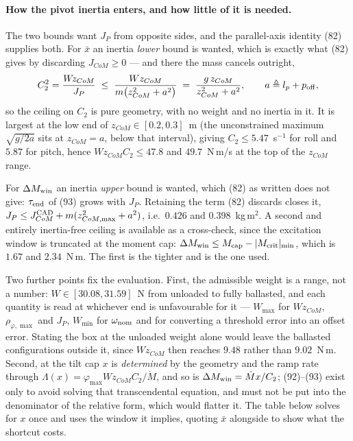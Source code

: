 \documentclass[10pt]{article}
\newcommand{\Wz}{W\!z_{CoM}}
\begin{document}
\paragraph{How the pivot inertia enters, and how little of it is needed.}
The two bounds want $J_P$ from opposite sides, and the parallel-axis
identity (82) supplies both. For $\bar x$ an inertia \emph{lower} bound
is wanted, which is exactly what (82) gives by discarding
$J_{CoM}\ge0$ --- and there the mass cancels outright,
\[
  C_2^{2} = \frac{\Wz}{J_P}
  \;\le\; \frac{W z_{CoM}}{m\bigl(z_{CoM}^2 + a^2\bigr)}
  \;=\; \frac{g\,z_{CoM}}{z_{CoM}^2 + a^2},
  \qquad a \triangleq l_p + p_{\rm off},
\]
so the ceiling on $C_2$ is pure geometry, with no weight and no
inertia in it. It is largest at the low end of $z_{CoM}\in[0.2,0.3]$~m
(the unconstrained maximum $\sqrt{g/2a}$ sits at $z_{CoM} = a$, below
that interval), giving $C_2\le5.47$~s$^{-1}$ for roll and $5.87$ for
pitch, hence $\Wz C_2 \le 47.8$ and $49.7$~N\,m/s at the top of the
$z_{CoM}$ range.

For $\Delta M_{\rm win}$ an inertia \emph{upper} bound is wanted, which
(82) as written does not give: $\tau_{\rm end}$ of (93) grows with
$J_P$. Retaining the term (82) discards closes it,
$J_P \le J_{CoM}^{\rm CAD} + m(z_{CoM,\max}^2 + a^2)$, i.e.\ $0.426$ and
$0.398$~kg\,m$^2$. A second and entirely inertia-free ceiling is
available as a cross-check, since the excitation window is truncated at
the moment cap: $\Delta M_{\rm win}\le M_{\rm cap} - |M_{\rm crit}|_{\min}$,
which is $1.67$ and $2.34$~N\,m. The first is the tighter and is the
one used.

Two further points fix the evaluation. First, the admissible weight is
a range, not a number: $W\in[30.08, 31.59]$~N from unloaded to fully
ballasted, and each quantity is read at whichever end is unfavourable
for it --- $W_{\max}$ for $\Wz$, $\rho_{\varphi,\max}$ and $J_P$,
$W_{\min}$ for $\omega_{\rm nom}$ and for converting a threshold error
into an offset error. Stating the box at the unloaded weight alone
would leave the ballasted configurations outside it, since
$\Wz$ then reaches $9.48$ rather than $9.02$~N\,m. Second, at the tilt
cap $x$ is \emph{determined} by the geometry and the ramp rate through
$\Lambda(x) = \varphi_{\max}\Wz C_2/\dot M$, and so is
$\Delta M_{\rm win} = \dot M x/C_2$; (92)--(93) exist only to avoid
solving that transcendental equation, and must not be put into the
denominator of the relative form, which would flatter it. The table
below solves for $x$ once and uses the window it implies, quoting
$\bar x$ alongside to show what the shortcut costs.
\end{document}
